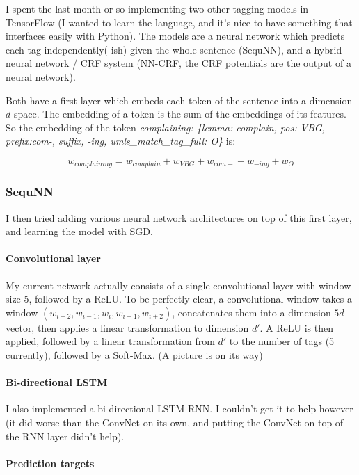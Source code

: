 \documentclass[10pt,a4paper]{article}
\begin{document}
  I spent the last month or so implementing two other tagging models in TensorFlow (I wanted to learn the language, and it's nice to have something that interfaces easily with Python). The models are a neural network which predicts each tag independently(-ish) given the whole sentence (SequNN), and a hybrid neural network / CRF system (NN-CRF, the CRF potentials are the output of a neural network).

  Both have a first layer which embeds each token of the sentence into a dimension $d$ space. The embedding of a token is the sum of the embeddings of its features. So the embedding of the token {\sl{ complaining: \{lemma: complain, pos: VBG, prefix:com-, suffix, -ing, umls\_match\_tag\_full: O\}}} is:
  
  $$w_{complaining} = w_{complain} + w_{VBG} + w_{com-} + w_{-ing} + w_{O}$$

\subsubsection{SequNN}

  I then tried adding various neural network architectures on top of this first layer, and learning the model with SGD.

  \paragraph{Convolutional layer}
  
  My current network actually consists of a single convolutional layer with window size 5, followed by a ReLU. To be perfectly clear, a convolutional window takes a window $(w_{i-2}, w_{i-1}, w_{i}, w_{i+1}, w_{i+2})$, concatenates them into a dimension $5d$ vector, then applies a linear transformation to dimension $d'$. A ReLU is then applied, followed by a linear transformation from $d'$ to the number of tags (5 currently), followed by a Soft-Max. (A picture is on its way)

  \paragraph{Bi-directional LSTM}

  I also implemented a bi-directional LSTM RNN. I couldn't get it to help however (it did worse than the ConvNet on its own, and putting the ConvNet on top of the RNN layer didn't help).

  \paragraph{Prediction targets}
\end{document}
